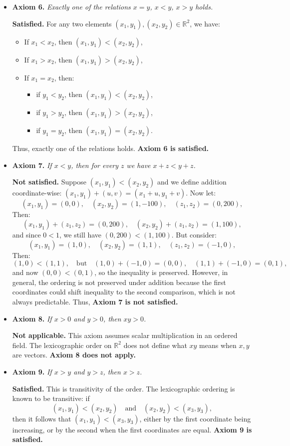 \begin{itemize}
\item \textbf{Axiom 6.} \emph{Exactly one of the relations \(x = y\), \(x < y\), \(x > y\) holds.}

\textbf{Satisfied.}  
For any two elements \((x_1, y_1), (x_2, y_2) \in \mathbb{R}^2\), we have:
\begin{itemize}
\item If \(x_1 < x_2\), then \((x_1, y_1) < (x_2, y_2)\),
\item If \(x_1 > x_2\), then \((x_1, y_1) > (x_2, y_2)\),
\item If \(x_1 = x_2\), then:
\begin{itemize}
\item if \(y_1 < y_2\), then \((x_1, y_1) < (x_2, y_2)\),
\item if \(y_1 > y_2\), then \((x_1, y_1) > (x_2, y_2)\),
\item if \(y_1 = y_2\), then \((x_1, y_1) = (x_2, y_2)\).
\end{itemize}
\end{itemize}
Thus, exactly one of the relations holds. \textbf{Axiom 6 is satisfied.}

\item \textbf{Axiom 7.} \emph{If \(x < y\), then for every \(z\) we have \(x + z < y + z\).}

\textbf{Not satisfied.}  
Suppose \((x_1, y_1) < (x_2, y_2)\) and we define addition coordinate-wise: \((x_1, y_1) + (u, v) = (x_1 + u, y_1 + v)\). Now let:
\[
(x_1, y_1) = (0, 0), \quad (x_2, y_2) = (1, -100), \quad (z_1, z_2) = (0, 200),
\]
Then:
\[
(x_1, y_1) + (z_1, z_2) = (0, 200), \quad (x_2, y_2) + (z_1, z_2) = (1, 100),
\]
and since \(0 < 1\), we still have \((0, 200) < (1, 100)\). But consider:
\[
(x_1, y_1) = (1, 0), \quad (x_2, y_2) = (1, 1), \quad (z_1, z_2) = (-1, 0),
\]
Then:
\[
(1, 0) < (1, 1), \quad \text{but} \quad (1, 0) + (-1, 0) = (0, 0), \quad (1, 1) + (-1, 0) = (0, 1),
\]
and now \((0, 0) < (0, 1)\), so the inequality is preserved. However, in general, the ordering is not preserved under addition because the first coordinates could shift inequality to the second comparison, which is not always predictable. Thus, \textbf{Axiom 7 is not satisfied.}

\item \textbf{Axiom 8.} \emph{If \(x > 0\) and \(y > 0\), then \(xy > 0\).}

\textbf{Not applicable.}  
This axiom assumes scalar multiplication in an ordered field. The lexicographic order on \(\mathbb{R}^2\) does not define what \(xy\) means when \(x, y\) are vectors. \textbf{Axiom 8 does not apply.}

\item \textbf{Axiom 9.} \emph{If \(x > y\) and \(y > z\), then \(x > z\).}

\textbf{Satisfied.}  
This is transitivity of the order. The lexicographic ordering is known to be transitive: if
\[
(x_1, y_1) < (x_2, y_2) \quad \text{and} \quad (x_2, y_2) < (x_3, y_3),
\]
then it follows that \((x_1, y_1) < (x_3, y_3)\), either by the first coordinate being increasing, or by the second when the first coordinates are equal. \textbf{Axiom 9 is satisfied.}
\end{itemize}


